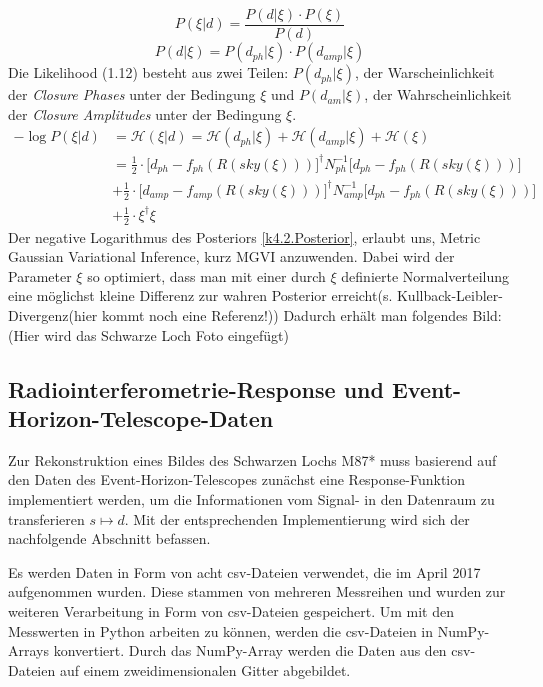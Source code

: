 \begin{equation}
P(\xi|d)= \frac {P(d|\xi)\cdot P(\xi)}{ P(d) }
\end{equation}
\begin{equation}
P(d|\xi)=  {P(d_{ph}|\xi)\cdot P(d_{amp}|\xi)}    
\end{equation}
Die Likelihood (1.12) besteht aus zwei Teilen: $P(d_{ph}|\xi)$, der Warscheinlichkeit der \emph{Closure Phases} unter der Bedingung $\xi$ und $P(d_{am}| \xi)$, der Wahrscheinlichkeit der \emph{ Closure Amplitudes} unter der Bedingung $\xi$.
\begin{align} \label{k4.2.Posterior}
 -\log {P(\xi|d)} &=
 \mathcal{H} (\xi|d) = \mathcal{H} (d_{ph}|\xi)+\mathcal{H} (d_{amp}|\xi)+\mathcal{H} (\xi) \\
&= \frac {1}{2}\cdot \Bigg[d_{ph} - f_{ph}(R(sky(\xi))) \Bigg]^\dagger N^{-1}_{ph} \Bigg[d_{ph} - f_{ph}(R(sky(\xi))) \Bigg]
\\  & + \frac {1}{2}\cdot \Bigg[d_{amp} - f_{amp}(R(sky(\xi))) \Bigg]^\dagger N_{amp}^{-1}\Bigg[d_{ph} - f_{ph}(R(sky(\xi))) \Bigg] \nonumber
\\ & +  \frac {1}{2} \cdot \xi^\dagger \xi \nonumber  
\end{align}
Der negative Logarithmus des Posteriors \cref{k4.2.Posterior}, erlaubt uns, Metric Gaussian Variational Inference, kurz MGVI \parencite{k4.2.mgvi} anzuwenden. Dabei wird der Parameter $\xi$ so optimiert, dass man mit einer durch $\xi$ definierte Normalverteilung eine möglichst kleine Differenz zur wahren Posterior erreicht(s. Kullback-Leibler-Divergenz(hier kommt noch eine Referenz!)) %
Dadurch erhält man folgendes Bild:
(Hier wird das Schwarze Loch Foto eingefügt)



\subsection{Radiointerferometrie-Response und Event-Horizon-Telescope-Daten}

Zur Rekonstruktion eines Bildes des Schwarzen Lochs M87* muss basierend auf den Daten des Event-Horizon-Telescopes zunächst eine Response-Funktion implementiert werden, um die Informationen vom Signal- in den Datenraum zu transferieren $s \mapsto d$. Mit der entsprechenden Implementierung wird sich der nachfolgende Abschnitt befassen.

Es werden Daten in Form von acht csv-Dateien verwendet, die im April 2017 aufgenommen wurden. Diese stammen von mehreren Messreihen und wurden zur weiteren Verarbeitung in Form von csv-Dateien gespeichert.
Um mit den Messwerten in Python arbeiten zu können, werden die csv-Dateien in NumPy-Arrays konvertiert. Durch das NumPy-Array werden die Daten aus den csv-Dateien auf einem zweidimensionalen Gitter abgebildet.

